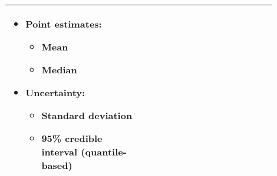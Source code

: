 \documentclass{article}
\begin{document}
\begin{appendix}
{\begin{table}[H]
\begin{tabular}{| p{0.45\linewidth} | p{0.45\linewidth} |}
\begin{itemize}
				\item Point estimates: 
				\begin{itemize}
					\item Mean 
					\item Median
				\end{itemize}
				\item Uncertainty: 
				\begin{itemize}
					\item Standard deviation
					\item 95\% credible interval (quantile-based)
				\end{itemize}
			\end{itemize}\\
		\hline 
	\end{tabular}
\end{table}}



\end{appendix}

\end{document}
